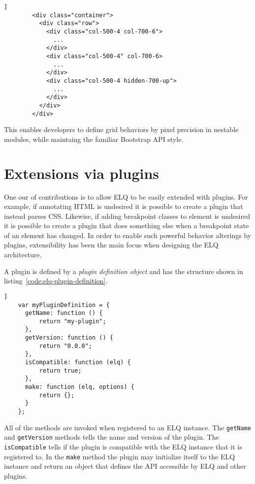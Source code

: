 \documentclass{acm_proc_article-sp}
\newcommand{\code}[1]{\texttt{#1}}
\newcommand{\elq}{ELQ}
\begin{document}
      \begin{lstlisting}[gobble=8,caption={},captionpos=b,label={code:elq-grid-example}]]
        <div class="container">
          <div class="row">
            <div class="col-500-4 col-700-6">
              ...
            </div>
            <div class="col-500-4" col-700-6>
              ...
            </div>
            <div class="col-500-4 hidden-700-up">
              ...
            </div>
          </div>
        </div>
      \end{lstlisting}

      This enables developers to define grid behaviors by pixel precision in nestable modules, while maintaing the familiar Bootstrap API style.


\section{Extensions via plugins}
  One our of contributions is to allow \elq{} to be easily extended with plugins.
  For example, if annotating HTML is undesired it is possible to create a plugin that instead parses CSS.
  Likewise, if adding breakpoint classes to element is undesired it is possible to create a plugin that does something else when a breakpoint state of an element has changed.
  In order to enable such powerful behavior alterings by plugins, extensibility has been the main focus when designing the \elq{} architecture.

  A plugin is defined by a \emph{plugin definition object} and has the structure shown in listing~\ref{code:elq-plugin-definition}.
  \begin{lstlisting}[gobble=4,caption={},captionpos=b,label={code:elq-plugin-definition}]]
    var myPluginDefinition = {
      getName: function () {
          return "my-plugin";
      },
      getVersion: function () {
          return "0.0.0";
      },
      isCompatible: function (elq) {
          return true;
      },
      make: function (elq, options) {
          return {};
      }
    };
  \end{lstlisting}

  All of the methods are invoked when registered to an \elq{} instance.
  The \code{getName} and \code{getVersion} methods tells the name and version of the plugin.
  The \code{isCompatible} tells if the plugin is compatible with the \elq{} instance that it is registered to.
  In the \code{make} method the plugin may initialize itself to the \elq{} instance and return an object that defines the API accessible by \elq{} and other plugins.
\end{document}
